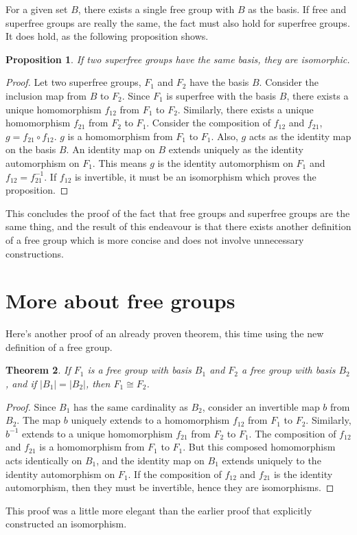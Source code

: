 \documentclass[12pt, titlepage]{article}
\newtheorem{thm}{Theorem}[section]
\newtheorem{prop}[thm]{Proposition}
\theoremstyle{definition}
\begin{document}
For a given set $B$, there exists a single free group with $B$ as the basis. If free and superfree groups are really the same, the fact must also hold for superfree groups. It does hold, as the following proposition shows.

\begin{prop}\label{univ}
If two superfree groups have the same basis, they are isomorphic.
\end{prop}

\begin{proof}
Let two superfree groups, $F_1$ and $F_2$ have the basis $B$. Consider the inclusion map from $B$ to $F_2$. Since $F_1$ is superfree with the basis $B$, there exists a unique homomorphism $f_{12}$ from $F_1$ to $F_2$. Similarly, there exists a unique homomorphism $f_{21}$ from $F_2$ to $F_1$. Consider the composition of $f_{12}$ and $f_{21}$, $g = f_{21} \circ f_{12}$. $g$ is a homomorphism from $F_1$ to $F_1$. Also, $g$ acts as the identity map on the basis $B$. An identity map on $B$ extends uniquely as the identity automorphism on $F_1$. This means $g$ is the identity automorphism on $F_1$ and $f_{12} = f_{21}^{-1}$. If $f_{12}$ is invertible, it must be an isomorphism which proves the proposition.
\end{proof}

This concludes the proof of the fact that free groups and superfree groups are the same thing, and the result of this endeavour is that there exists another definition of a free group which is more concise and does not involve unnecessary constructions.

\section{More about free groups}

Here's another proof of an already proven theorem, this time using the new definition of a free group.

\begin{thm}
If $F_1$ is a free group with basis $B_1$ and $F_2$ a free group with basis $B_2$, and if $|B_1|=|B_2|$, then $F_1 \cong F_2$.
\end{thm}

\begin{proof}
Since $B_1$ has the same cardinality as $B_2$, consider an invertible map $b$ from $B_2$. The map $b$ uniquely extends to a homomorphism $f_{12}$ from $F_1$ to $F_2$. Similarly, $b^{-1}$ extends to a unique homomorphism $f_{21}$ from $F_2$ to $F_1$. The composition of $f_{12}$ and $f_{21}$ is a homomorphism from $F_1$ to $F_1$. But this composed homomorphism acts identically on $B_1$, and the identity map on $B_1$ extends uniquely to the identity automorphism on $F_1$. If the composition of $f_{12}$ and $f_{21}$ is the identity automorphism, then they must be invertible, hence they are isomorphisms.
\end{proof}
This proof was a little more elegant than the earlier proof that explicitly constructed an isomorphism.
\end{document}
